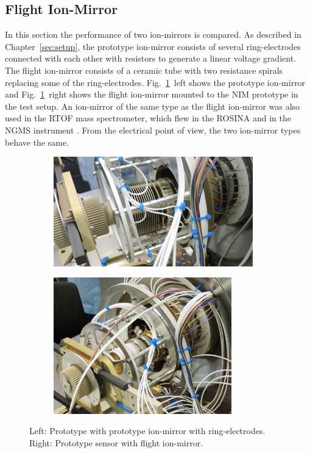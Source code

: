 	\subsection{Flight Ion-Mirror}
	In this section the performance of two ion-mirrors is compared. As described in Chapter~\ref{sec:setup}, the prototype ion-mirror consists of several ring-electrodes connected with each other with resistors to generate a linear voltage gradient. The flight ion-mirror consists of a ceramic tube with two resistance spirals replacing some of the ring-electrodes. Fig.~\ref{fig:ExpRefl}~left shows the prototype ion-mirror and Fig.~\ref{fig:ExpRefl}~right shows the flight ion-mirror mounted to the NIM prototype in the test setup. An ion-mirror of the same type as the flight ion-mirror was also used in the RTOF mass spectrometer, which flew in the ROSINA \cite{Diss_Scherer} and in the NGMS instrument \cite{Diss_Hofer}. From the electrical point of view, the two ion-mirror types behave the same.\\
	\begin{figure}[H]
		\begin{subfigure}{0.5\textwidth}
			\centering
			\includegraphics[width = 0.95\textwidth]{Experiments/reflectron_Prototype1.jpg}
		\end{subfigure}
		\begin{subfigure}{0.5\textwidth}
			\centering
			\includegraphics[width = 0.85\textwidth]{Experiments/reflectron_flight.JPG}
		\end{subfigure}
		\caption{Left: Prototype with prototype ion-mirror with ring-electrodes. Right: Prototype sensor with flight ion-mirror.}
		\label{fig:ExpRefl}
	\end{figure}
